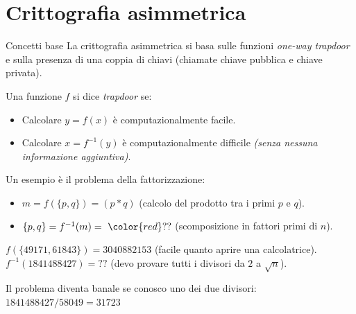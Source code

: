 \documentclass[handout, xcolor=dvipsnames,aspectratio=169]{beamer}
\begin{document}

\part{Crittografia asimmetrica}

\begin{frame}
	\partpage
	\centering
\end{frame}

\begin{frame}{Concetti base}
  La crittografia asimmetrica si basa sulle funzioni \textit{one-way trapdoor} e sulla presenza di una coppia di chiavi (chiamate chiave pubblica e chiave privata).
  
  \pause
  
  \medskip
  
  Una funzione $f$ si dice \textit{trapdoor} se: 
  \begin{itemize}
    \item Calcolare $y = f(x)$ è computazionalmente facile.
    \item Calcolare $x = f^{-1}(y)$ è computazionalmente difficile \textit{(senza nessuna informazione aggiuntiva)}.
  \end{itemize}

  \pause
  
  \smallskip
  
  Un esempio è il problema della fattorizzazione:
  \begin{itemize}
    \item $m = f(\{p, q\}) = (p * q)$ (calcolo del prodotto tra i primi $p$ e $q$).
    \item $\{p, q\} = f^{-1}(m) =\ {\color{red}??} $ (scomposizione in fattori primi di $n$).
  \end{itemize}
    
  \smallskip
  
  \pause
  
  $f(\{49171, 61843\}) = 3040882153$ (facile quanto aprire una calcolatrice).
  $f^{-1}(1841488427) = ??$ (devo provare tutti i divisori da $2$ a $\sqrt{n}$).
  
  \pause
  
  Il problema diventa banale se conosco uno dei due divisori:
  $1841488427 / 58049 = 31723$

\end{frame}
\end{document}
